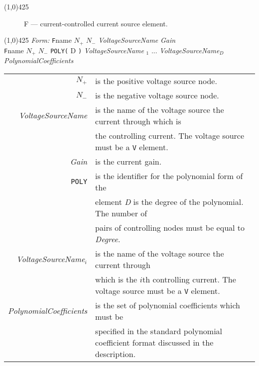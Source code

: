 
\oddsidemargin 10mm \topmargin 0.0in \textwidth 5.5in \textheight 7.375in
\evensidemargin 1.0in \headheight 0.18in \footskip 0.16in
%
\section[F \- Current-Controlled Current Source]{}
\linethickness{1mm}
\line(1,0){425}
\normalsize
\begin{figure}[h]
\centerline{\epsfxsize=3in} \caption{F ---
current-controlled current source element.}
\end{figure}
\linethickness{0.5mm} \line(1,0){425}
\newline
\textit{Form:}
\newline
{\tt F}name $N_{+}$ $N_{-}$ {\it VoltageSourceName} {\it Gain}\\
     {\tt F}name $N_{+}$ $N_{-}$ {\tt POLY(} D {\tt )}
     {\it VoltageSourceName} $_1$ ...  {\it VoltageSourceName}$_D$ {\it
     PolynomialCoefficients}
\newline
\begin{tabular}{r l}
$N_{+}$ & is the positive voltage source node.\\
$N_{-}$ & is the negative voltage source node.\\
{\it VoltageSourceName} & is the name of the voltage source the
current through which is \\
& the controlling current. The voltage source must be a {\tt V} element.\\
{\it Gain} & is the current gain.\\
{\tt POLY} & is the identifier for the polynomial form of the\\
& element {\it D} is the degree of the polynomial. The number of\\
& pairs of controlling nodes must be equal to {\it Degree}.\\
{\it VoltageSourceName$_i$} & is the name of the voltage source
the current through \\
& which is the $i$th controlling current. The voltage source must be a {\tt V} element.\\
{\it PolynomialCoefficients} & is the set of polynomial
coefficients which must be \\
& specified in the standard polynomial coefficient format
discussed in the description.
\end{tabular}
